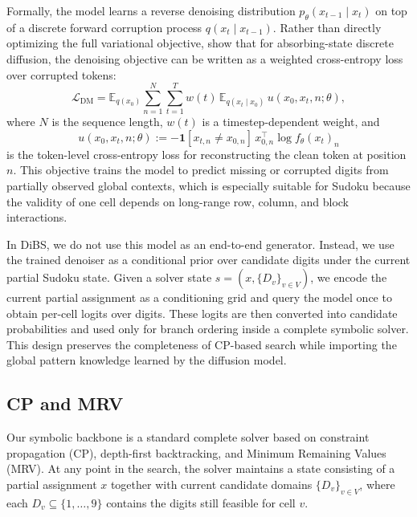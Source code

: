 \documentclass[lettersize,journal]{IEEEtran}
\begin{document}
Formally, the model learns a reverse denoising distribution \(p_\theta(x_{t-1}\mid x_t)\) on top of a discrete forward corruption process \(q(x_t\mid x_{t-1})\). Rather than directly optimizing the full variational objective, \cite{ye2025beyond} show that for absorbing-state discrete diffusion, the denoising objective can be written as a weighted cross-entropy loss over corrupted tokens:
\begin{equation}
	\mathcal{L}_{\mathrm{DM}}
	=
	\mathbb{E}_{q(x_0)}
	\sum_{n=1}^{N}\sum_{t=1}^{T}
	w(t)\,
	\mathbb{E}_{q(x_t\mid x_0)}
	\,u(x_0,x_t,n;\theta),
	\label{eq:dm_loss}
\end{equation}
where \(N\) is the sequence length, \(w(t)\) is a timestep-dependent weight, and
\begin{equation}
	u(x_0,x_t,n;\theta)
	:=
	-\mathbf{1}[x_{t,n}\neq x_{0,n}]\, x_{0,n}^{\top}\log f_\theta(x_t)_n
	\label{eq:dm_token_loss}
\end{equation}
is the token-level cross-entropy loss for reconstructing the clean token at position \(n\). This objective trains the model to predict missing or corrupted digits from partially observed global contexts, which is especially suitable for Sudoku because the validity of one cell depends on long-range row, column, and block interactions.

In DiBS, we do not use this model as an end-to-end generator. Instead, we use the trained denoiser as a conditional prior over candidate digits under the current partial Sudoku state. Given a solver state \(s=(x,\{D_v\}_{v\in V})\), we encode the current partial assignment as a conditioning grid and query the model once to obtain per-cell logits over digits. These logits are then converted into candidate probabilities and used only for branch ordering inside a complete symbolic solver. This design preserves the completeness of CP-based search while importing the global pattern knowledge learned by the diffusion model.



\subsection{CP and MRV}

Our symbolic backbone is a standard complete solver based on constraint propagation (CP), depth-first backtracking, and Minimum Remaining Values (MRV)\cite{freuder1982sufficient}. At any point in the search, the solver maintains a state consisting of a partial assignment \(x\) together with current candidate domains \(\{D_v\}_{v\in V}\), where each \(D_v \subseteq \{1,\dots,9\}\) contains the digits still feasible for cell \(v\).
\end{document}
